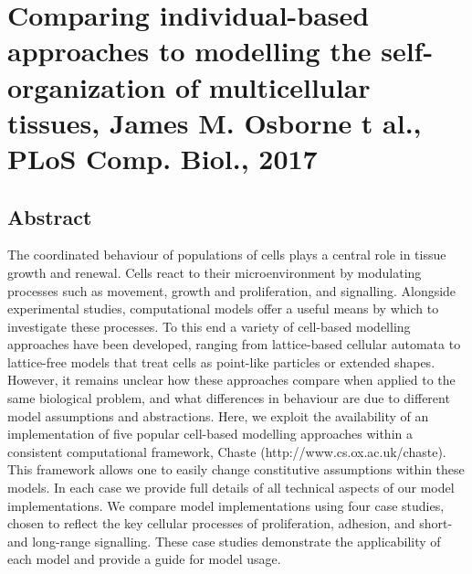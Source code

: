 \documentclass[11pt,a4paper]{article}
\begin{document}
\section*{Comparing individual-based approaches to modelling the self-organization of multicellular tissues, James M. Osborne t al., \textbf{PLoS Comp. Biol.}, 2017}
\subsection*{Abstract}
The coordinated behaviour of populations of cells plays a central role in tissue growth and renewal. Cells react to their microenvironment by modulating processes such as movement, growth and proliferation, and signalling. Alongside experimental studies, computational models offer a useful means by which to investigate these processes. To this end a variety of cell-based modelling approaches have been developed, ranging from lattice-based cellular automata to lattice-free models that treat cells as point-like particles or extended shapes. However, it remains unclear how these approaches compare when applied to the same biological problem, and what differences in behaviour are due to different model assumptions and abstractions. Here, we exploit the availability of an implementation of five popular cell-based modelling approaches within a consistent computational framework, Chaste (http://www.cs.ox.ac.uk/chaste). This framework allows one to easily change constitutive assumptions within these models. In each case we provide full details of all technical aspects of our model implementations. We compare model implementations using four case studies, chosen to reflect the key cellular processes of proliferation, adhesion, and short- and long-range signalling. These case studies demonstrate the applicability of each model and provide a guide for model usage.
\end{document}
